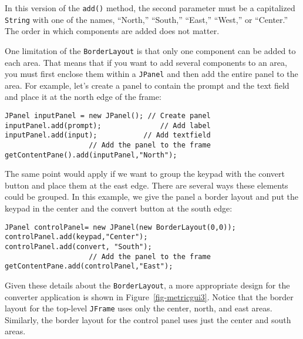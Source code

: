 \noindent In this version of the {\tt add()} method, the second parameter
must be a capitalized {\tt String} with one of the names, ``North,''
``South,'' ``East,'' ``West,'' or ``Center.''  The order in which components
are added does not matter.

One limitation of the {\tt BorderLayout} is that only one component
can be added to each area.  That means that if you want to add
several components to an area, you must first enclose them within a
{\tt JPanel} and then add the entire panel to the area.   For example,
let's create a panel to contain the prompt and the text field and
place it at the north edge of the frame:

\begin{jjjlisting}
\begin{lstlisting}
JPanel inputPanel = new JPanel(); // Create panel
inputPanel.add(prompt);              // Add label
inputPanel.add(input);           // Add textfield
                    // Add the panel to the frame
getContentPane().add(inputPanel,"North");
\end{lstlisting}
\end{jjjlisting}

The same point would apply if we want to group the keypad
with the convert button and place them at the east edge.
There are several ways these elements could be grouped.  In this
example, we give the panel a border layout and put the keypad
in the center and the convert button at the south edge:

\begin{jjjlisting}
\begin{lstlisting}
JPanel controlPanel= new JPanel(new BorderLayout(0,0));
controlPanel.add(keypad,"Center");
controlPanel.add(convert, "South");
                    // Add the panel to the frame
getContentPane.add(controlPanel,"East"); 
\end{lstlisting}
\end{jjjlisting}

Given these details about the {\tt BorderLayout}, a more appropriate
design for the converter application is shown in
Figure~\ref{fig-metricgui3}.  Notice that the border layout for the
top-level {\tt JFrame} uses only the center, north, and east areas.
Similarly, the border layout for the control panel uses just the
center and south areas.

